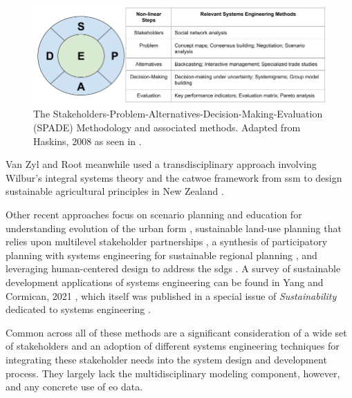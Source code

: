 \begin{figure}[!htb]
\centering
\includegraphics[scale=0.4]{Figures/chap3/spade.png}
\caption[The SPADE Methodology and associated methods]{The Stakeholders-Problem-Alternatives-Decision-Making-Evaluation (SPADE) Methodology and associated methods. Adapted from Haskins, 2008 \cite{haskinsSystemsEngineeringAnalyzed2008} as seen in \cite{reidSystemsEngineeringAppliedPendingPublication}.}
\label{fig:spade}
\end{figure}

Van Zyl and Root meanwhile used a transdisciplinary approach involving Wilbur's integral systems theory \cite{esbjorn-hargensOverviewIntegralTheory2010} and the \ac{catwoe} framework from \ac{ssm} \cite{checklandSoftSystemsMethodology2000} to design sustainable agricultural principles in New Zealand \cite{vanzylTransdisciplinaryDesignImplementation2020}.

Other recent approaches focus on scenario planning and education for understanding evolution of the urban form \cite{geyerSystemsEngineeringMethodology2014}, sustainable land-use planning that relies upon multilevel stakeholder partnerships \cite{puchol-salortUrbanPlanningSustainability2021}, a synthesis of participatory planning with systems engineering for sustainable regional planning \cite{aspenDevelopingParticipatoryPlanning2021}, and leveraging human-centered design to address the \acp{sdg} \cite{muellerUsingHumanCenteredDesign2020}. A survey of sustainable development applications of systems engineering can be found in Yang and Cormican, 2021 \cite{yangCrossoversConnectivitySystems2021}, which itself was published in a special issue of \textit{Sustainability} dedicated to systems engineering \cite{haskinsSystemsEngineeringSustainable2021}.

Common across all of these methods are a significant consideration of a wide set of stakeholders and an adoption of different systems engineering techniques for integrating these stakeholder needs into the system design and development process. They largely lack the multidisciplinary modeling component, however, and any concrete use of \ac{eo} data.

